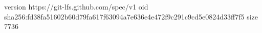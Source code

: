 version https://git-lfs.github.com/spec/v1
oid sha256:fd38fa51602b60d79fa617f63094a7e636e4e472f9c291c9cd5e0824d33ff7f5
size 7736
